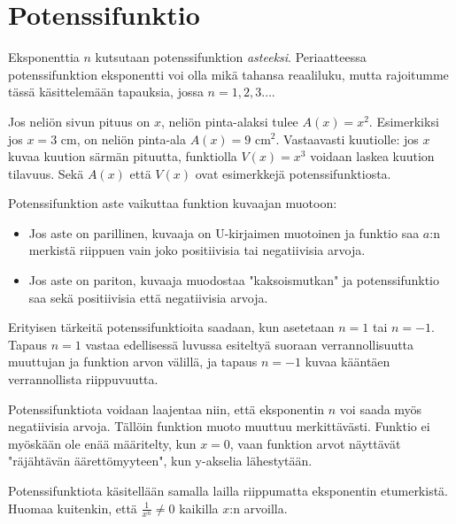 \chapter{Potenssifunktio}


Eksponenttia $n$ kutsutaan potenssifunktion \emph{asteeksi}. Periaatteessa
potenssifunktion eksponentti voi olla mikä tahansa reaaliluku, mutta
rajoitumme tässä käsittelemään tapauksia, jossa $n = 1, 2, 3\ldots $.

\begin{esimerkki}
Jos neliön sivun pituus on $x$, neliön pinta-alaksi tulee $A(x)=x^2$.
Esimerkiksi jos $x = 3$ cm, on neliön pinta-ala $A(x) = 9$ cm$^2$.
Vastaavasti kuutiolle: jos $x$ kuvaa kuution särmän pituutta, funktiolla
$V(x)=x^3$ voidaan laskea kuution tilavuus. Sekä $A(x)$ että $V(x)$ ovat
esimerkkejä potenssifunktiosta.
\end{esimerkki}

Potenssifunktion aste vaikuttaa funktion kuvaajan muotoon:
\begin{itemize}
  \item
Jos aste on parillinen, kuvaaja on U-kirjaimen muotoinen ja funktio
saa $a$:n merkistä riippuen vain joko positiivisia tai negatiivisia arvoja.
  \item
Jos aste on pariton, kuvaaja muodostaa "kaksoismutkan" ja potenssifunktio
saa sekä positiivisia että negatiivisia arvoja.
\end{itemize}


Erityisen tärkeitä potenssifunktioita saadaan, kun asetetaan $n = 1$ tai
$n = -1$. Tapaus $n = 1$ vastaa edellisessä luvussa esiteltyä suoraan verrannollisuutta muuttujan ja funktion arvon välillä, ja tapaus $n = -1$
kuvaa kääntäen verrannollista riippuvuutta.

Potenssifunktiota voidaan laajentaa niin, että eksponentin $n$ voi saada myös negatiivisia arvoja.
Tällöin funktion muoto muuttuu merkittävästi. Funktio ei myöskään ole
enää määritelty, kun $x = 0$, vaan funktion arvot näyttävät
"räjähtävän äärettömyyteen", kun y-akselia lähestytään.


Potenssifunktiota käsitellään samalla lailla riippumatta eksponentin
etumerkistä. Huomaa kuitenkin, että $\frac{1}{x^n} \neq 0 $ kaikilla $x$:n arvoilla.

